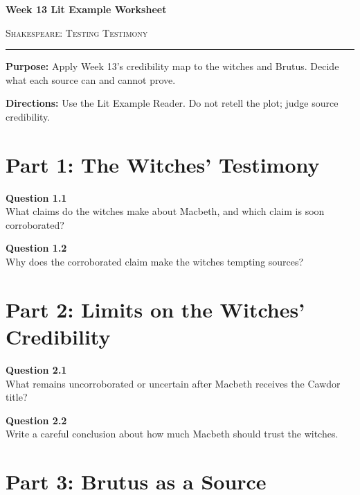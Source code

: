 \documentclass[12pt]{article}
\begin{document}
\begin{center}
{\LARGE\bfseries Week 13 Lit Example Worksheet}\par\vspace{0.05em}
{\large\scshape Shakespeare: Testing Testimony}\par\vspace{0.12em}
\rule{0.78\textwidth}{0.5pt}
\end{center}

\textbf{Purpose:} Apply Week 13's credibility map to the witches and Brutus. Decide what each source can and cannot prove.

\textbf{Directions:} Use the Lit Example Reader. Do not retell the plot; judge source credibility.

\section*{Part 1: The Witches' Testimony}

\textbf{Question 1.1}\\[-0.15em]
What claims do the witches make about Macbeth, and which claim is soon corroborated?


\textbf{Question 1.2}\\[-0.15em]
Why does the corroborated claim make the witches tempting sources?


\newpage

\section*{Part 2: Limits on the Witches' Credibility}

\textbf{Question 2.1}\\[-0.15em]
What remains uncorroborated or uncertain after Macbeth receives the Cawdor title?


\textbf{Question 2.2}\\[-0.15em]
Write a careful conclusion about how much Macbeth should trust the witches.


\newpage

\section*{Part 3: Brutus as a Source}
\end{document}
